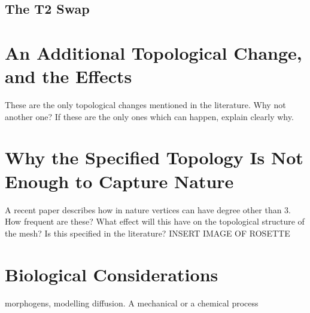 \subsection{The T2 Swap}


\section{An Additional Topological Change, and the Effects}
These are the only topological changes mentioned in the literature. Why not another one?
If these are the only ones which can happen, explain clearly why.

\section{Why the Specified Topology Is Not Enough to Capture Nature}A recent paper describes how in nature vertices can have degree other than 3. 
How frequent are these?  What effect will this have on the topological structure of the mesh?
Is this specified in the literature?
INSERT IMAGE OF ROSETTE


\section{Biological Considerations}
morphogens, modelling diffusion. 
A mechanical or a chemical process
